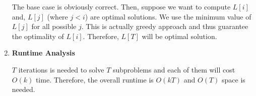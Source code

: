 \documentclass[11pt]{article}
\newenvironment{qparts}{\begin{enumerate}[{(}a{)}]}{\end{enumerate}}
\begin{document}
\begin{qparts}
\begin{enumerate}
		The base case is obviously correct. Then, suppose we want to compute $L[i]$ and, $L[j]$ (where $j<i$) are optimal solutions. We use the minimum value of $L[j]$ for all possible $j$. This is actually greedy approach and thus guarantee the  optimality of $L[i]$. Therefore, $L[T]$ will be optimal solution.
		
		\item \textbf{Runtime Analysis}
		
		$T$ iterations is needed to solve $T$ subproblems and each of them will cost $O(k)$ time. Therefore, the overall runtime is $O(kT)$ and $O(T)$ space is needed.
	
	\end{enumerate}
		
\end{qparts}
\end{document}
